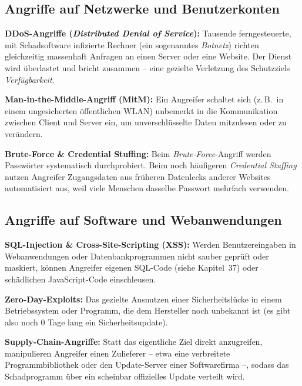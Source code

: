 \subsection{Angriffe auf Netzwerke und Benutzerkonten}

\begin{compactitem}
\item \textbf{DDoS-Angriffe (\emph{Distributed Denial of Service}):} Tausende
ferngesteuerte, mit Schadsoftware infizierte Rechner (ein sogenanntes
\emph{Botnetz}) richten gleichzeitig massenhaft Anfragen an einen Server oder
eine Website. Der Dienst wird überlastet und bricht zusammen -- eine gezielte
Verletzung des Schutzziels \emph{Verfügbarkeit}.
\item \textbf{Man-in-the-Middle-Angriff (MitM):} Ein Angreifer schaltet sich
(z.\,B.\ in einem ungesicherten öffentlichen WLAN) unbemerkt in die
Kommunikation zwischen Client und Server ein, um unverschlüsselte Daten
mitzulesen oder zu verändern.
\item \textbf{Brute-Force \& Credential Stuffing:} Beim \emph{Brute-Force}-Angriff
werden Passwörter systematisch durchprobiert. Beim noch häufigeren
\emph{Credential Stuffing} nutzen Angreifer Zugangsdaten aus früheren
Datenlecks anderer Websites automatisiert aus, weil viele Menschen dasselbe
Passwort mehrfach verwenden.
\end{compactitem}

\subsection{Angriffe auf Software und Webanwendungen}

\begin{compactitem}
\item \textbf{SQL-Injection \& Cross-Site-Scripting (XSS):} Werden
Benutzereingaben in Webanwendungen oder Datenbankprogrammen nicht sauber
geprüft oder maskiert, können Angreifer eigenen SQL-Code (siehe Kapitel~37)
oder schädlichen JavaScript-Code einschleusen.
\item \textbf{Zero-Day-Exploits:} Das gezielte Ausnutzen einer
Sicherheitslücke in einem Betriebssystem oder Programm, die dem Hersteller noch
unbekannt ist (es gibt also noch $0$ Tage lang ein Sicherheitsupdate).
\item \textbf{Supply-Chain-Angriffe:} Statt das eigentliche Ziel direkt
anzugreifen, manipulieren Angreifer einen Zulieferer -- etwa eine verbreitete
Programmbibliothek oder den Update-Server einer Softwarefirma --, sodass das
Schadprogramm über ein scheinbar offizielles Update verteilt wird.
\end{compactitem}


